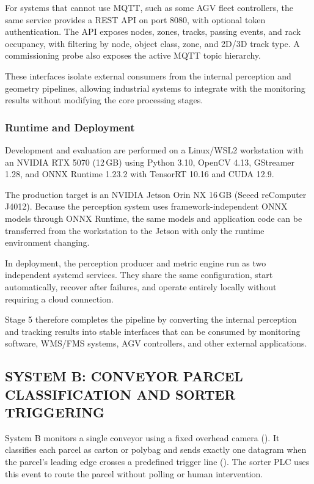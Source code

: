 \documentclass[9pt,a4paper,twocolumn]{rho-class/rho}
\begin{document}
For systems that cannot use MQTT, such as some AGV fleet controllers, the same service provides a REST API on port 8080, with optional token authentication. The API exposes nodes, zones, tracks, passing events, and rack occupancy, with filtering by node, object class, zone, and 2D/3D track type. A commissioning probe also exposes the active MQTT topic hierarchy.

These interfaces isolate external consumers from the internal perception and geometry pipelines, allowing industrial systems to integrate with the monitoring results without modifying the core processing stages.

\subsubsection{Runtime and Deployment}

Development and evaluation are performed on a Linux/WSL2 workstation with an NVIDIA RTX 5070 (12\,GB) using Python 3.10, OpenCV 4.13, GStreamer 1.28, and ONNX Runtime 1.23.2 with TensorRT 10.16 and CUDA 12.9.

The production target is an NVIDIA Jetson Orin NX 16\,GB (Seeed reComputer J4012). Because the perception system uses framework-independent ONNX models through ONNX Runtime, the same models and application code can be transferred from the workstation to the Jetson with only the runtime environment changing.

In deployment, the perception producer and metric engine run as two independent systemd services. They share the same configuration, start automatically, recover after failures, and operate entirely locally without requiring a cloud connection.

Stage 5 therefore completes the pipeline by converting the internal perception and tracking results into stable interfaces that can be consumed by monitoring software, WMS/FMS systems, AGV controllers, and other external applications.

\subsection{SYSTEM B: CONVEYOR PARCEL CLASSIFICATION AND SORTER TRIGGERING}

System B monitors a single conveyor using a fixed overhead camera (). It classifies each parcel as carton or polybag and sends exactly one datagram when the parcel's leading edge crosses a predefined trigger line (). The sorter PLC uses this event to route the parcel without polling or human intervention.
\end{document}
